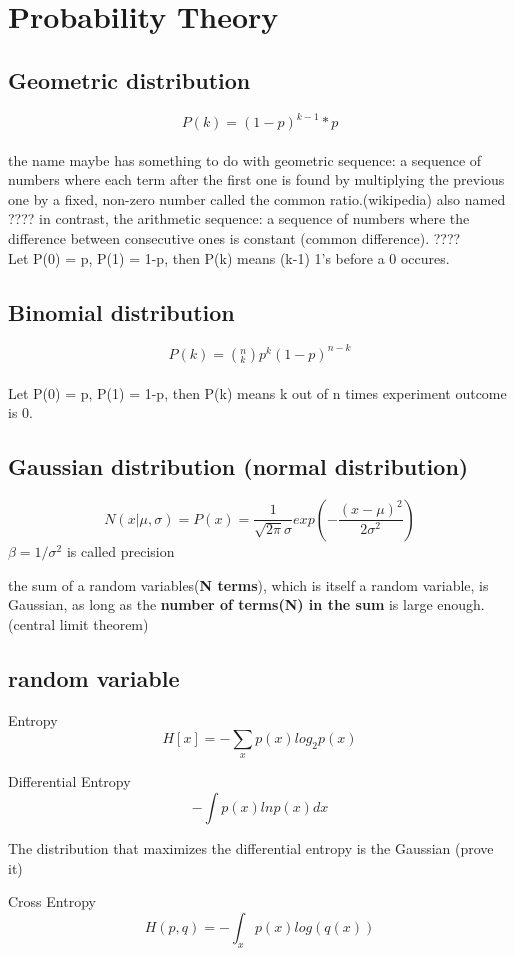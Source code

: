 \documentclass[10pt,a4paper]{book}
\begin{document}
\section{Probability Theory}


	\subsection{Geometric distribution}
	$$P(k) = (1-p)^{k-1}*p$$
	\\
	the name maybe has something to do with geometric sequence: a sequence of numbers where each term after the first one is found by multiplying the previous one by a fixed, non-zero number called the common ratio.(wikipedia)   
	also named ????   
	in contrast, the arithmetic sequence:   
	a sequence of numbers where the difference between consecutive ones is constant (common difference).   
	????   
	\\
	Let P(0) = p, P(1) = 1-p, then P(k) means (k-1) 1's before a 0 occures.


	\subsection{Binomial distribution}
	$$P(k) = (^n_k)p^k(1-p)^{n-k}$$
	\\
	Let P(0) = p, P(1) = 1-p, then P(k) means k out of n times experiment outcome is 0.
	
	\subsection{Gaussian distribution (normal distribution)}
	$$N(x|\mu,\sigma) = P(x) = \frac 1 {\sqrt{2\pi}\sigma} exp(-\frac {(x-\mu)^2} {2\sigma^2})$$
	$\beta = 1/\sigma^2$ is called precision

	the sum of a random variables(\textbf{N terms}), which is itself a random variable, is Gaussian, as long as the \textbf{number of terms(N) in the sum} is large enough. (central limit theorem)
	
	\subsection {random variable}
	Entropy
	$$H[x]= - \sum_{x} p(x)log_2p(x)$$
	
	Differential Entropy
	$$-\int p(x)lnp(x)dx $$
	
	The distribution that maximizes the differential entropy is the Gaussian (prove it)
		
	Cross Entropy
	$$H(p,q) = - \int_x p(x) log(q(x))$$
		
\end{document}

